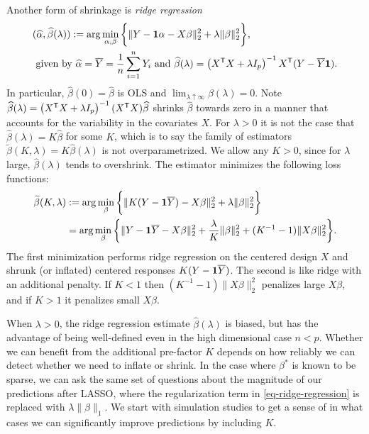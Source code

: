 \documentclass[main]{subfiles}
\begin{document}
Another form of shrinkage is {\sl ridge regression}
\begin{align}
\label{eq-ridge-regression}
&(\widehat\alpha,\widehat\beta(\lambda)) := \arg\min_{\alpha,\beta}\bigg\{\|Y - {\bf1}\alpha-X\beta\|_2^2 + \lambda\|\beta\|_2^2\bigg\},  \\
&\text{ given by }
\widehat\alpha = \overline{Y} = \frac{1}{n}\sum_{i=1}^n Y_i
\text{ and }
\widehat\beta(\lambda) = \left(X^\mathsf{T}X + \lambda I_p\right)^{-1}X^\mathsf{T}(Y-\overline{Y}{\bf 1}).
\end{align}
In particular, $\widehat\beta(0) = \widehat\beta$ is OLS and $\lim_{\lambda\uparrow\infty}\widehat\beta(\lambda) = 0$. Note $\widehat\beta(\lambda) = \left(X^\mathsf{T}X + \lambda I_p\right)^{-1}(X^\mathsf T X)\widehat\beta$ shrinks $\widehat\beta$ towards zero in a manner that accounts for the variability in the covariates $X$.  For $\lambda > 0$ it is not the case that $\widehat\beta(\lambda) = K\widehat\beta$ for some $K$, which is to say the family of estimators $\widetilde\beta(K, \lambda) = K \widehat\beta(\lambda)$ is not overparametrized. We allow any $K > 0$, since for $\lambda$ large, $\widehat\beta(\lambda)$ tends to overshrink. The estimator minimizes the following loss functions:
\begin{align}
\widetilde\beta(K, \lambda) &:= \arg\min_{\beta}\bigg\{\|K(Y - {\bf1}\overline{Y})-X\beta\|_2^2 + \lambda\|\beta\|_2^2\bigg\} \\
&= \arg\min_{\beta}\bigg\{\|Y - {\bf1}\overline{Y}-X\beta\|_2^2 + \frac{\lambda}{K}\|\beta\|_2^2 + (K^{-1}-1)\|X\beta\|_2^2\bigg\}.
\end{align}
The first minimization performs ridge regression on the centered design $X$ and shrunk (or inflated) centered responses $K(Y - {\bf1}\overline{Y})$. The second is like ridge with an additional penalty. If $K < 1$ then $(K^{-1}-1)\|X\beta\|_2^2$ penalizes large $X\beta$, and if $K > 1$ it penalizes small $X\beta$.\smallskip

When $\lambda > 0$, the ridge regression estimate $\widehat\beta(\lambda)$ is biased, but has the advantage of being well-defined even in the high dimensional case $n < p$. Whether we can benefit from the additional pre-factor $K$ depends on how reliably we can detect whether we need to inflate or shrink. In the case where $\beta^*$ is known to be sparse, we can ask the same set of questions about the magnitude of our predictions after LASSO, where the regularization term in \eqref{eq-ridge-regression} is replaced with $\lambda\|\beta\|_1$. We start with simulation studies to get a sense of in what cases we can significantly improve predictions by including $K$.
\end{document}
